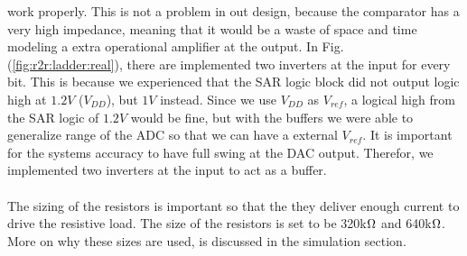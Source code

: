 \documentclass[english, 12pt, a4paper]{ifimaster}
\begin{document}
\newline
work properly. This is not a problem in out design, because the comparator has a very high impedance, meaning that it would be a waste of space and time modeling a extra operational amplifier at
the output. In Fig. (\ref{fig:r2r:ladder:real}), there are implemented two inverters at the input for every bit. This is because we experienced that the SAR logic block did not output logic high at
\(1.2 V\) (\(V_{DD}\)), but \(1 V\) instead. Since we use \(V_{DD}\) as \(V_{ref}\), a logical high from the SAR logic of \(1.2 V\) would be fine, but with the buffers we were able to generalize range of the ADC so that we can have a external \(V_{ref}\).
It is important for the systems accuracy to have full swing at the DAC output. Therefor, we implemented two inverters at the input to act as a buffer.\\ 
\\
The sizing of the resistors is important so that the they deliver enough current to drive the resistive load.
The size of the resistors is set to be 320k\(\ohm\) and 640k\(\ohm\). More on why these sizes are used, is discussed in the simulation section. 
\end{document}
